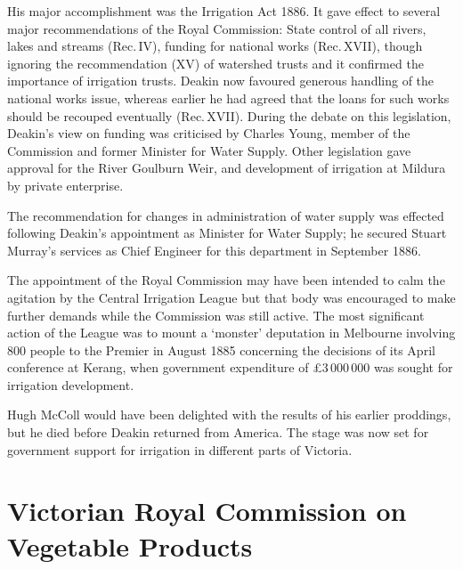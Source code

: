 His major accomplishment was the Irrigation Act
 1886. It gave effect to
several major recommendations of the Royal Commission: State control
of all rivers, lakes and streams (Rec.\,IV), funding for national
works (Rec.\,XVII), though ignoring the recommendation (XV) of
watershed trusts and it confirmed the importance of irrigation trusts.
Deakin now favoured generous handling of the national works issue,
whereas earlier he had agreed that the loans for such works should be
recouped eventually (Rec.\,XVII).  During the debate on this
legislation, Deakin's view on funding was criticised by Charles Young,
 member of the Commission and former Minister for
Water Supply.  Other legislation gave approval for the River Goulburn
Weir, and development of irrigation at Mildura 
by private enterprise.

The recommendation for changes in administration of water supply was
effected following Deakin's appointment as Minister for Water Supply;
he secured Stuart Murray's  services as Chief
Engineer for this department in September 1886.

The appointment of the Royal Commission may have been intended to calm
the agitation by the Central Irrigation League
 but that body was
encouraged to make further demands while the Commission was still
active.  The most significant action of the League was to mount a
`monster' deputation in Melbourne involving 800 people to the Premier
in August 1885 concerning the decisions of its April conference at
Kerang,  when government expenditure of
\pounds3\,000\,000 was sought for irrigation
development.

Hugh McColl would have been delighted with the results of his earlier
proddings, but he died before Deakin returned from America.  The stage
was now set for government support for irrigation in different parts
of Victoria.

\section*{Victorian Royal Commission on Vegetable Products}

